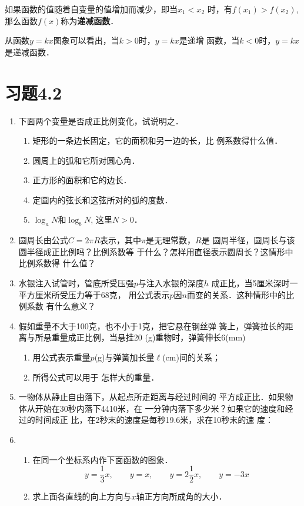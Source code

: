 如果函数的值随着自变量的值增加而减少，即当$x_1<x_2$
时，有$f(x_1)>f(x_2)$, 那么函数$f(x)$称为\textbf{递减函数}．

从函数$y=kx$图象可以看出，当$k>0$时，$y=kx$是递增
函数，当$k<0$时，$y=kx$是递减函数．

\section*{习题4.2}
\begin{enumerate}
    \item   下面两个变量是否成正比例变化，试说明之．
\begin{enumerate}
\item 矩形的一条边长固定，它的面积和另一边的长，比
    例系数得什么值．
    \item 圆周上的弧和它所对圆心角．
    \item 正方形的面积和它的边长．
    \item 定圆内的弦长和这弦所对的弧的度数．
    \item $\log_a N$和$\log_b N$, 这里$N>0$．
\end{enumerate}

    \item 圆周长由公式$C=2\pi R$表示，其中$\pi$是无理常数，$R$是
    圆周半径，圆周长与该圆半径成正比例吗？比例系数等
    于什么？怎样用直径表示圆周长？这情形中比例系数得
    什么值？
    \item 水银注入试管时，管底所受压强$p$与注入水银的深度$h$
    成正比，当5厘米深时一平方厘米所受压力等于68克，
    用公式表示$p$因$n$而变的关系．这种情形中的比例系数
    有什么意义？
    \item 
    假如重量不大于100克，也不小于1克，把它悬在钢丝弹
    簧上，弹簧拉长的距离与所悬重量成正比例，当悬挂20
    (g)重物时，弹簧伸长6(mm)
\begin{enumerate}
    \item 用公式表示重量$p$(g)与弹簧加长量$\ell$(cm)间的关系；
    \item 所得公式可以用于
    怎样大的重量．
\end{enumerate}    

    \item 一物体从静止自由落下，从起点所走距离与经过时间的
    平方成正比．如果物体从开始在30秒内落下4410米，在
    一分钟内落下多少米？如果它的速度和经过的时间成正
    比，在2秒末的速度是每秒19.6米，求在10秒末的速
度：
\item \begin{enumerate}
    \item 在同一个坐标系内作下面函数的图象．
    \[y=\frac{1}{3}x,\qquad     y=x,\qquad y=2\frac{1}{2}x,\qquad     y=-3x\]
    \item 求上面各直线的向上方向与$x$轴正方向所成角的大小．
\end{enumerate} 



\end{enumerate}
